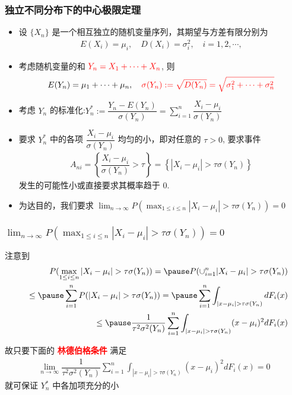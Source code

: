 \begin{frame}
	\frametitle{独立不同分布下的中心极限定理}
	\begin{itemize}[<+-|alert@+>]
		\item 设 $\{X_n\}$ 是一个相互独立的随机变量序列，其期望与方差有限分别为
		\begin{eqnarray*}
			E(X_i)=\mu_i, \quad D(X_i)=\sigma_i^2, \quad i=1,2,\cdots,
		\end{eqnarray*}
		\item 考虑随机变量的和 $\textcolor{red}{Y_n=X_1+\cdots+X_n}$, 则
		\begin{eqnarray*}
			E(Y_n)=\mu_1+\cdots+\mu_n,\quad \textcolor{red}{\sigma(Y_n):=\sqrt{D(Y_n)}=\sqrt{\sigma_1^2+\cdots+\sigma_n^2}}
		\end{eqnarray*}
		\item 考虑 $Y_n$ 的标准化:$ Y_n^*:=\dfrac{Y_n-E (Y_n)}{\sigma (Y_n)}=\sum_{i=1}^n\dfrac{X_i-\mu_i}{\sigma (Y_n)}$
		\item 要求 $Y_n^*$ 中的各项 $\dfrac{X_i-\mu_i}{\sigma (Y_n)}$ 均匀的小，即对任意的 $\tau>0$, 要求事件
		\begin{eqnarray*}
			A_{ni}=\left\{\dfrac{X_i-\mu_i}{\sigma(Y_n)}>\tau\right\}=\left\{|X_i-\mu_i|>\tau\sigma(Y_n)\right\}
		\end{eqnarray*}
		发生的可能性小或直接要求其概率趋于 0.
		\item 为达目的，我们要求 $\lim_{n\rightarrow\infty} P (\max_{1\le i\le n}|X_i-\mu_i|>\tau\sigma (Y_n))=0$
	\end{itemize}
\end{frame}
\begin{frame}
	\frametitle{$\lim_{n\rightarrow\infty}P(\max_{1\le i\le n}|X_i-\mu_i|>\tau\sigma(Y_n))=0$}
	注意到
	\begin{eqnarray*}
		&&P(\max_{1\le i\le n}|X_i-\mu_i|>\tau\sigma(Y_n))=\pause P(\cup_{i=1}^n|X_i-\mu_i|>\tau\sigma(Y_n))\\
		&&\le\pause \sum_{i=1}^nP(|X_i-\mu_i|>\tau\sigma(Y_n))=\pause \sum_{i=1}^n\int_{|x-\mu_i|>\tau\sigma(Y_n)}dF_i(x)\\
		&&\le \pause \dfrac{1}{\tau^2\sigma^2(Y_n)}\sum_{i=1}^n\int_{|x-\mu_i|>\tau\sigma(Y_n)}(x-\mu_i)^2dF_i(x)
	\end{eqnarray*}

	\pause 故只要下面的 \textcolor{red}{\bf 林德伯格条件} 满足
	\begin{eqnarray*}%
		\lim_{n\rightarrow\infty} \dfrac{1}{\tau^2\sigma^2(Y_n)}\sum_{i=1}^n\int_{|x-\mu_i|>\tau\sigma(Y_n)}(x-\mu_i)^2dF_i(x)=0
	\end{eqnarray*}
	就可保证 $Y_n^*$ 中各加项充分的小


\end{frame}

